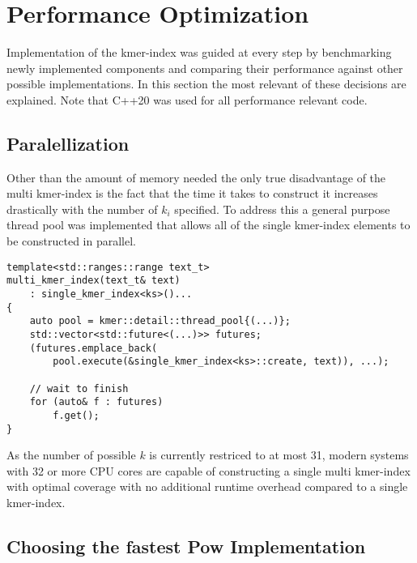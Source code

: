 \section{Performance Optimization}
Implementation of the kmer-index was guided at every step by benchmarking
newly implemented components and comparing their performance against
other possible implementations. In this section the most relevant
of these decisions are explained. Note that C++20 was used for all
performance relevant code.
\subsection{Paralellization}
Other than the amount of memory needed the only true disadvantage of the
multi kmer-index is the fact that the time it takes to construct it increases drastically with the
number of $k_{i}$ specified. To address this a general purpose thread pool was implemented that
allows all of the single kmer-index elements to be constructed in parallel.
\begin{minipage}{\linewidth}
\begin{lstlisting}[caption={Paralell invocation of the create function for individual single kmer-index
elements during construction of the multi kmer-index.}]
template<std::ranges::range text_t>
multi_kmer_index(text_t& text)
	: single_kmer_index<ks>()...
{
	auto pool = kmer::detail::thread_pool{(...)};
	std::vector<std::future<(...)>> futures;
	(futures.emplace_back(
		pool.execute(&single_kmer_index<ks>::create, text)), ...);

	// wait to finish
	for (auto& f : futures)
		f.get();
}
\end{lstlisting}
\end{minipage}

As the number of possible $k$ is currently restriced to at most 31, modern systems with 32 or more CPU cores are
capable of constructing a single multi kmer-index with optimal coverage with no additional runtime overhead compared
to a single kmer-index.

\subsection{Choosing the fastest Pow Implementation}
